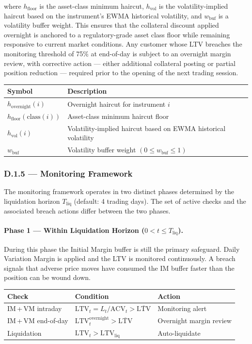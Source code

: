 \documentclass[9pt, a4paper]{extarticle}
\newcommand{\vartableheader}{%
    \textbf{Symbol} & \textbf{Description}\\
}
\begin{document}
where $h_{\text{floor}}$ is the asset-class minimum haircut, $h_{\text{vol}}$ is the
volatility-implied haircut based on the instrument's EWMA historical volatility, and
$w_{\text{buf}}$ is a volatility buffer weight. This ensures that the collateral
discount applied overnight is anchored to a regulatory-grade asset class floor while
remaining responsive to current market conditions. Any customer whose LTV breaches
the monitoring threshold of 75\% at end-of-day is subject to an overnight margin
review, with corrective action --- either additional collateral posting or partial
position reduction --- required prior to the opening of the next trading session.

\begin{tabularx}{\linewidth}{lX}
\toprule
\vartableheader
\midrule
$h_{\text{overnight}}(i)$ & Overnight haircut for instrument $i$ \\
$h_{\text{floor}}(\text{class}(i))$ & Asset-class minimum haircut floor \\
$h_{\text{vol}}(i)$ & Volatility-implied haircut based on EWMA historical volatility \\
$w_{\text{buf}}$ & Volatility buffer weight $(0 \leq w_{\text{buf}} \leq 1)$ \\
\bottomrule
\end{tabularx}

\subsubsection{D.1.5 — Monitoring Framework}

The monitoring framework operates in two distinct phases determined by the
liquidation horizon $T_{\text{liq}}$ (default: 4 trading days). The set of active
checks and the associated breach actions differ between the two phases.

\paragraph{Phase 1 — Within Liquidation Horizon ($0 < t \leq T_{\text{liq}}$).}
During this phase the Initial Margin buffer is still the primary safeguard. Daily
Variation Margin is applied and the LTV is monitored continuously. A breach signals
that adverse price moves have consumed the IM buffer faster than the position can be
wound down.

\begin{center}
\begin{tabularx}{0.96\linewidth}{lXl}
\toprule
\textbf{Check} & \textbf{Condition} & \textbf{Action} \\
\midrule
IM\,+\,VM intraday
    & $\mathrm{LTV}_t = L_t / \mathrm{ACV}_t > \overline{\mathrm{LTV}}$
    & Monitoring alert \\
IM\,+\,VM end-of-day
    & $\mathrm{LTV}_t^{\text{overnight}} > \overline{\mathrm{LTV}}$
    & Overnight margin review \\
Liquidation
    & $\mathrm{LTV}_t > \mathrm{LTV}_{\text{liq}}$
    & Auto-liquidate \\
\bottomrule
\end{tabularx}
\end{center}
\end{document}
